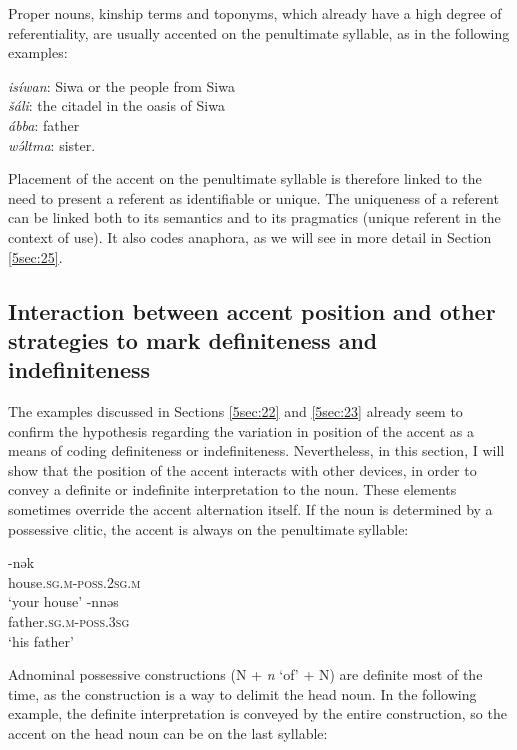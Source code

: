 \documentclass[output=paper]{langsci/langscibook}
\begin{document}
Proper nouns, kinship terms and toponyms, which already have a high degree of referentiality, are usually accented on the penultimate syllable, as in the following examples:

\begin{exe}
\exi{}
{\emph{isíwan}}: Siwa or the people from Siwa \\
{\emph{šáli}}: the citadel in the oasis of Siwa \\
{\emph{ábba}}: father \\
{\emph{wə́ltma}}: sister. 
\end{exe}

{
Placement of the accent on the penultimate syllable is therefore linked to the need to present a referent as identifiable or unique. The uniqueness of a referent can be linked both to its semantics and to its pragmatics (unique referent in the context of use). It also codes anaphora, as we will see in more detail in Section \ref{5sec:25}.
}

\subsection{Interaction between accent position and other strategies to mark definiteness and indefiniteness}\label{5sec:24}

The examples discussed in Sections \ref{5sec:22} and \ref{5sec:23} already seem to confirm the hypothesis regarding the variation in position of the accent as a means of coding definiteness or indefiniteness. Nevertheless, in this section, I will show that the position of the accent interacts with other devices, in order to convey a definite or indefinite interpretation to the noun. These elements sometimes override the accent alternation itself. If the noun is determined by a possessive clitic, the accent is always on the penultimate syllable:

\begin{exe}
\ex\label{5ex:22}
-nək \\
	house.{\textsc{sg.m-poss.2sg.m}} \\
\glt	`your house'
\ex\label{5ex:23}
-nnəs \\
	father.{\textsc{sg.m-poss.3sg}} \\
\glt	`his father'
\end{exe}

Adnominal possessive constructions (N + {\emph{n}} `of' + N) are definite most of the time, as the construction is a way to delimit the head noun. In the following example, the definite interpretation is conveyed by the entire construction, so the accent on the head noun can be on the last syllable:
\end{document}

